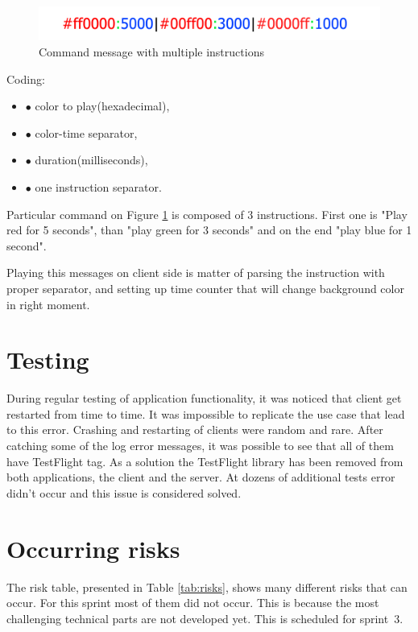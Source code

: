 \begin{figure}[H]
      	\centering
      		\includegraphics[width=16cm]{sprint2/protocol.png}
      	\caption{Command message with multiple instructions}
      	\label{fig:Command_new}
\end{figure}
Coding:
\begin{itemize}
\item[] \textcolor{red!80}{$\bullet$} color to play(hexadecimal),
\item[] \textcolor{green!100}{$\bullet$} color-time separator,
\item[] \textcolor{blue!100}{$\bullet$} duration(milliseconds),
\item[] \textcolor{black!100}{$\bullet$} one instruction separator.
\end{itemize}


Particular command on Figure \ref{fig:Command_new} is composed of 3 instructions. First one is "Play red for 5 seconds", than "play green for 3 seconds" and on the end "play blue for 1 second".

Playing this messages on client side is matter of parsing the instruction with proper separator, and setting up time counter that will change background color in right moment.

\section{Testing}
\label{section:test_flight_bug}
During regular testing of application functionality, it was noticed that client get restarted from time to time. It was impossible to replicate the use case that lead to this error. Crashing and restarting of clients were random and rare. After catching some of the log error messages, it was possible to see that all of them have TestFlight tag. As a solution the TestFlight library has been removed from both applications, the client and the server. At dozens of additional tests error didn't occur and this issue is considered solved.  

\section{Occurring risks}

The risk table, presented in Table \ref{tab:risks}, shows many different risks that can occur. 
For this sprint most of them did not occur. 
This is because the most challenging technical parts are not developed yet. 
This is scheduled for sprint~3. 

